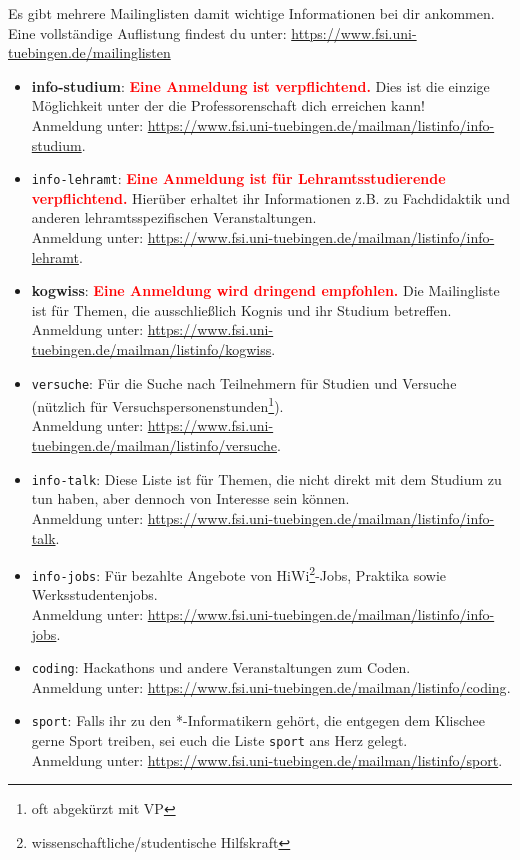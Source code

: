 Es gibt mehrere Mailinglisten damit wichtige Informationen bei dir ankommen.\\
Eine vollständige Auflistung findest du unter: \url{https://www.fsi.uni-tuebingen.de/mailinglisten}
\begin{itemize}
\item \textbf{info-studium}: \textcolor{red}{\textbf{Eine Anmeldung ist verpflichtend.}} Dies ist die einzige Möglichkeit unter der die Professorenschaft dich erreichen kann! \\
Anmeldung unter: \url{https://www.fsi.uni-tuebingen.de/mailman/listinfo/info-studium}.
\iflehramt
\item \texttt{info-lehramt}: \textcolor{red}{\textbf{Eine Anmeldung ist für Lehramtsstudierende verpflichtend.}} Hierüber erhaltet ihr Informationen z.B. zu Fachdidaktik und anderen lehramtsspezifischen Veranstaltungen.\\
Anmeldung unter: \url{https://www.fsi.uni-tuebingen.de/mailman/listinfo/info-lehramt}.
\fi
\ifkogwiss
\item \textbf{kogwiss}: \textcolor{red}{\textbf{Eine Anmeldung wird dringend empfohlen.}} Die Mailingliste ist für Themen, die ausschließlich Kognis und ihr Studium betreffen. \\
Anmeldung unter: \url{https://www.fsi.uni-tuebingen.de/mailman/listinfo/kogwiss}.

\item \texttt{versuche}: Für die Suche nach Teilnehmern für Studien und Versuche (nützlich für Versuchspersonenstunden\footnote{oft abgekürzt mit VP}).\\
Anmeldung unter: \url{https://www.fsi.uni-tuebingen.de/mailman/listinfo/versuche}.
\fi
\item \texttt{info-talk}: Diese Liste ist für Themen, die nicht direkt mit dem Studium zu tun haben, aber dennoch von Interesse sein können.\\
Anmeldung unter: \url{https://www.fsi.uni-tuebingen.de/mailman/listinfo/info-talk}.
\item \texttt{info-jobs}: Für bezahlte Angebote von HiWi\footnote{wissenschaftliche/studentische Hilfskraft}-Jobs, Praktika sowie  Werksstudentenjobs.\\
Anmeldung unter: \url{https://www.fsi.uni-tuebingen.de/mailman/listinfo/info-jobs}.
\item \texttt{coding}: Hackathons und andere Veranstaltungen zum Coden.\\
Anmeldung unter: \url{https://www.fsi.uni-tuebingen.de/mailman/listinfo/coding}.
\item \texttt{sport}: Falls ihr zu den *-Informatikern gehört, die entgegen dem Klischee gerne Sport treiben, sei euch die Liste \texttt{sport} ans Herz gelegt.\\
Anmeldung unter: \url{https://www.fsi.uni-tuebingen.de/mailman/listinfo/sport}.
\end{itemize}
